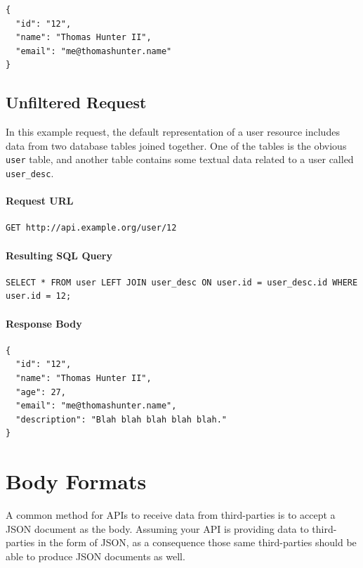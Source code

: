 \documentclass{book}
\begin{document}
\begin{verbatim}
{
  "id": "12",
  "name": "Thomas Hunter II",
  "email": "me@thomashunter.name"
}
\end{verbatim}

\subsection{Unfiltered Request}

In this example request, the default representation of a user resource includes data from two database tables joined together. One of the tables is the obvious \texttt{user} table, and another table contains some textual data related to a user called \texttt{user\_desc}.

\paragraph{\textbf{Request URL}}

\begin{verbatim}
GET http://api.example.org/user/12
\end{verbatim}

\paragraph{\textbf{Resulting SQL Query}}

\begin{verbatim}
SELECT * FROM user LEFT JOIN user_desc ON user.id = user_desc.id WHERE user.id = 12;
\end{verbatim}

\paragraph{\textbf{Response Body}}

\begin{verbatim}
{
  "id": "12",
  "name": "Thomas Hunter II",
  "age": 27,
  "email": "me@thomashunter.name",
  "description": "Blah blah blah blah blah."
}
\end{verbatim}


\section{Body Formats}

A common method for APIs to receive data from third-parties is to accept a JSON document as the body. Assuming your API is providing data to third-parties in the form of JSON, as a consequence those same third-parties should be able to produce JSON documents as well.
\end{document}
